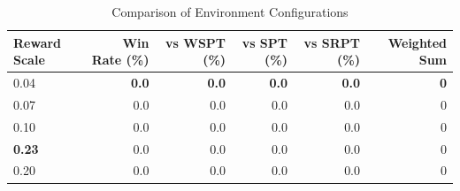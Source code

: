 \begin{table}[htbp]%
\centering%
\begin{tabular}{lrrrrr}%
\toprule%
\textbf{Reward Scale}&\textbf{Win Rate (\%)}&\textbf{vs WSPT (\%)}&\textbf{vs SPT (\%)}&\textbf{vs SRPT (\%)}&\textbf{Weighted Sum}\\%
\midrule%
0.04&\textbf{0.0}&\textbf{0.0}&\textbf{0.0}&\textbf{0.0}&\textbf{0}\\%
0.07&0.0&0.0&0.0&0.0&0\\%
0.10&0.0&0.0&0.0&0.0&0\\%
\textbf{0.23}&0.0&0.0&0.0&0.0&0\\%
0.20&0.0&0.0&0.0&0.0&0\\%
\bottomrule%
\end{tabular}%
\caption{Comparison of Environment Configurations}%
\label{tab:environment}%
\end{table}